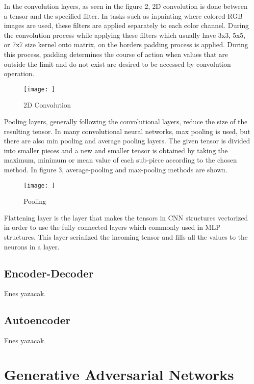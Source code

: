 In the convolution layers, as seen in the figure 2, 2D convolution is done between a tensor and the specified filter. In tasks such as inpainting where colored RGB images are used, these filters are applied separately to each color channel. During the convolution process while applying these filters which usually have 3x3, 5x5, or 7x7 size kernel onto matrix, on the borders padding process is applied. During this process, padding determines the course of action when values that are outside the limit and do not exist are desired to be accessed by convolution operation.

\begin{figure}[h]
    \centering
    \texttt{[image: ]}
    \caption{2D Convolution}
    \label{fig:my_label}
\end{figure}

Pooling layers, generally following the convolutional layers, reduce the size of the resulting tensor. In many convolutional neural networks, max pooling is used, but there are also min pooling and average pooling layers. The given tensor is divided into smaller pieces and a new and smaller tensor is obtained by taking the maximum, minimum or mean value of each sub-piece according to the chosen method. In figure 3, average-pooling and max-pooling methods are shown.

\begin{figure}[h]
    \centering
    \texttt{[image: ]}
    \caption{Pooling}
    \label{fig:my_label}
\end{figure}

Flattening layer is the layer that makes the tensors in CNN structures vectorized in order to use the fully connected layers which commonly used in MLP structures. This layer serialized the incoming tensor and fills all the values to the neurons in a layer.

\subsection{Encoder-Decoder}

Enes yazacak.

\subsection{Autoencoder}

Enes yazacak.

\section{Generative Adversarial Networks}


